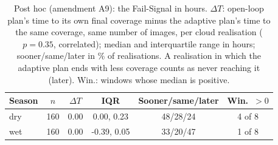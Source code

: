 \begin{table}[!t]
\centering
\footnotesize
\renewcommand{\arraystretch}{1.2}
\setlength{\tabcolsep}{3pt}
\caption{Post hoc (amendment A9): the Fail-Signal in hours. $\Delta T$: open-loop plan's time to its own final coverage minus the adaptive plan's time to the same coverage, same number of images, per cloud realisation ($p = 0.35$, correlated); median and interquartile range in hours; sooner/same/later in \% of realisations. A realisation in which the adaptive plan ends with less coverage counts as never reaching it (later). Win.: windows whose median is positive.}
\label{tab:a9_failsignal}
\begin{tabular}{|l|c|c|c|c|c|}
\hline
Season & $n$ & $\Delta T$ & IQR & Sooner/same/later & Win.\ $>0$ \\
\hline
dry & 160 & 0.00 & 0.00, 0.23 & 48/28/24 & 4 of 8 \\
\hline
wet & 160 & 0.00 & -0.39, 0.05 & 33/20/47 & 1 of 8 \\
\hline
\end{tabular}
\end{table}
